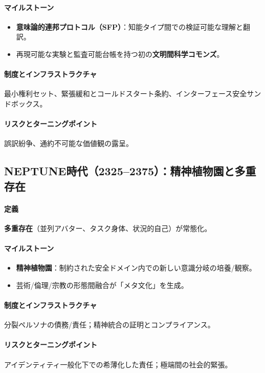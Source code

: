 \documentclass[11pt]{article}
\begin{document}
\paragraph{マイルストーン}
\begin{itemize}[noitemsep]
  \item \textbf{意味論的連邦プロトコル（SFP）}：知能タイプ間での検証可能な理解と翻訳。
  \item 再現可能な実験と監査可能台帳を持つ初の\textbf{文明間科学コモンズ}。
\end{itemize}

\paragraph{制度とインフラストラクチャ} 最小権利セット、緊張緩和とコールドスタート条約、インターフェース安全サンドボックス。

\paragraph{リスクとターニングポイント} 誤訳紛争、通約不可能な価値観の露呈。

\subsection{NEPTUNE時代（2325–2375）：精神植物園と多重存在}
\paragraph{定義} \textbf{多重存在}（並列アバター、タスク身体、状況的自己）が常態化。

\paragraph{マイルストーン}
\begin{itemize}[noitemsep]
  \item \textbf{精神植物園}：制約された安全ドメイン内での新しい意識分岐の培養/観察。
  \item 芸術/倫理/宗教の形態間融合が「メタ文化」を生成。
\end{itemize}

\paragraph{制度とインフラストラクチャ} 分裂ペルソナの債務/責任；精神統合の証明とコンプライアンス。

\paragraph{リスクとターニングポイント} アイデンティティ一般化下での希薄化した責任；極端間の社会的緊張。
\end{document}
